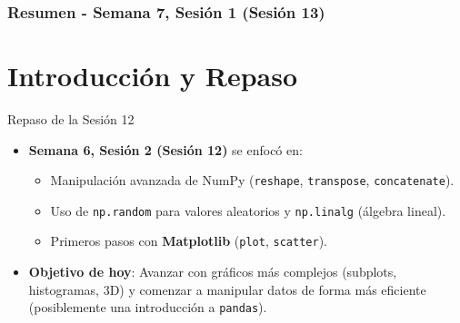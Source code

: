 \documentclass[10pt]{beamer}
\begin{document}
\myfront{}

\begin{frame}
  \titlepage
\end{frame}

\begin{frame}
  \frametitle{Resumen - Semana 7, Sesión 1 (Sesión 13)}
  \tableofcontents
\end{frame}


\section{Introducción y Repaso}

\begin{frame}{Repaso de la Sesión 12}
  \begin{itemize}
    \item \textbf{Semana 6, Sesión 2 (Sesión 12)} se enfocó en:
      \begin{itemize}
        \item Manipulación avanzada de NumPy (\texttt{reshape}, \texttt{transpose}, \texttt{concatenate}).
        \item Uso de \texttt{np.random} para valores aleatorios y \texttt{np.linalg} (álgebra lineal).
        \item Primeros pasos con \textbf{Matplotlib} (\texttt{plot}, \texttt{scatter}).
      \end{itemize}
    \item \textbf{Objetivo de hoy}: Avanzar con gráficos más complejos (subplots, histogramas, 3D) y comenzar a manipular datos de forma más eficiente (posiblemente una introducción a \texttt{pandas}).
  \end{itemize}
\end{frame}
\end{document}
